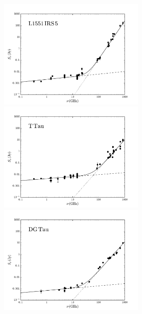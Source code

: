 \documentclass[9pt]{extarticle}   	%
\begin{document}
\begin{figure}[h!]
\begin{center}
\includegraphics[width=0.65\textwidth]{plots/L1551.pdf}\\
\includegraphics[width=0.65\textwidth]{plots/TTau.pdf}\\
\includegraphics[width=0.65\textwidth]{plots/DGTau.pdf}
\label{default}
\end{center}
\end{figure}



\clearpage
\end{document}
